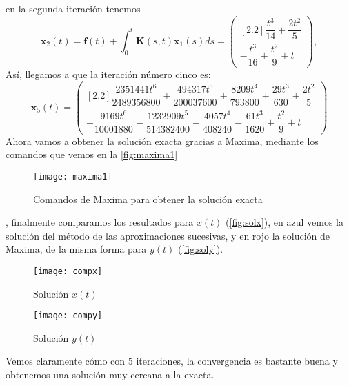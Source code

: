 \begin{ejemplo}
\begin{equation}
	\end{equation}
	en la segunda iteración tenemos
	\begin{equation}
		\textbf{x}_{2}(t) = \textbf{f}(t) + \int_0^t \textbf{K}(s,t)\textbf{x}_1(s)ds = \begin{pmatrix}[2.2] \dfrac{t^3}{14}+\dfrac{2t^2}{5}\\ -\dfrac{t^3}{16}+\dfrac{t^2}{9}+t	\end{pmatrix},
	\end{equation}
	Así, llegamos a que la iteración número cinco es:
	\begin{equation}
		\textbf{x}_5(t) = \begin{pmatrix}[2.2]
			\dfrac{2351441t^6}{2489356800}+\dfrac{494317t^5}{200037600}+\dfrac{8209t^4}{793800}+\dfrac{29t^3}{630}+\dfrac{2t^2}{5}   \\ -\dfrac{9169t^6}{10001880}-\dfrac{1232909t^5}{514382400}-\dfrac{4057t^4}{408240}-\dfrac{61t^3}{1620}+\dfrac{t^2}{9}+t
		\end{pmatrix}
	\end{equation}
	Ahora vamos a obtener la solución exacta gracias a Maxima, mediante los comandos que vemos en la \autoref{fig:maxima1}
	\begin{figure}[h!]
		\centering
		\texttt{[image: maxima1]}
		\caption{Comandos de Maxima para obtener la solución exacta}
		\label{fig:maxima1}
	\end{figure}
	, finalmente comparamos los resultados para $x(t)$ (\autoref{fig:solx}), en azul vemos la solución del método de las aproximaciones sucesivas, y en rojo la solución de Maxima, de la misma forma para $y(t)$ (\autoref{fig:soly}).
	\begin{figure}[h!]
		\centering
		\texttt{[image: compx]}
		\caption{Solución $x(t)$}
		\label{fig:solx}
	\end{figure}
	\begin{figure}[h!]
		\centering
		\texttt{[image: compy]}
		\caption{Solución $y(t)$}
		\label{fig:soly}
	\end{figure}
	Vemos claramente cómo con $5$ iteraciones, la convergencia es bastante buena y obtenemos una solución muy cercana a la exacta.
\end{ejemplo}
\endinput
-